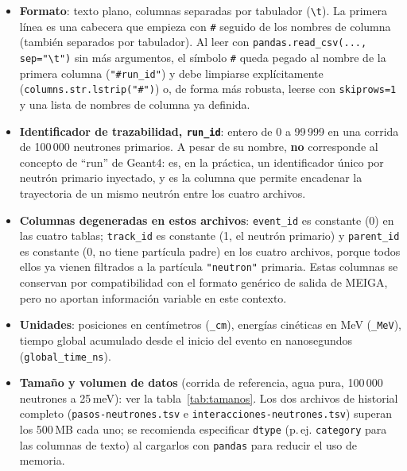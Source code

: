 \documentclass[11pt,a4paper]{article}
\newcommand{\codigo}[1]{\nolinkurl{#1}}
\newcommand{\archivo}[1]{\texttt{#1}} %
\newcommand{\var}[1]{\texttt{#1}}
\begin{document}
\begin{itemize}
  \item \textbf{Formato}: texto plano, columnas separadas por tabulador (\texttt{\textbackslash t}).
  La primera línea es una cabecera que empieza con \texttt{\#} seguido de los nombres de columna
  (también separados por tabulador). Al leer con \texttt{pandas.read\_csv(..., sep="\textbackslash t")}
  sin más argumentos, el símbolo \texttt{\#} queda pegado al nombre de la primera columna
  (\texttt{"\#run\_id"}) y debe limpiarse explícitamente (\codigo{columns.str.lstrip("\#")}) o, de
  forma más robusta, leerse con \codigo{skiprows=1} y una lista de nombres de columna ya definida.
  \item \textbf{Identificador de trazabilidad, \var{run\_id}}: entero de 0 a 99\,999 en una corrida
  de 100\,000 neutrones primarios. A pesar de su nombre, \textbf{no} corresponde al concepto de
  ``run'' de Geant4: es, en la práctica, un identificador único por neutrón primario inyectado, y es
  la columna que permite encadenar la trayectoria de un mismo neutrón entre los cuatro archivos.
  \item \textbf{Columnas degeneradas en estos archivos}: \var{event\_id} es constante (0) en las
  cuatro tablas; \var{track\_id} es constante (1, el neutrón primario) y \var{parent\_id} es
  constante (0, no tiene partícula padre) en los cuatro archivos, porque todos ellos ya vienen
  filtrados a la partícula \var{"neutron"} primaria. Estas columnas se conservan por compatibilidad
  con el formato genérico de salida de MEIGA, pero no aportan información variable en este contexto.
  \item \textbf{Unidades}: posiciones en centímetros (\var{\_cm}), energías cinéticas en MeV
  (\var{\_MeV}), tiempo global acumulado desde el inicio del evento en nanosegundos
  (\var{global\_time\_ns}).
  \item \textbf{Tamaño y volumen de datos} (corrida de referencia, agua pura, 100\,000 neutrones a
  25\,meV): ver la tabla~\ref{tab:tamanos}. Los dos archivos de historial completo
  (\archivo{pasos-neutrones.tsv} e \archivo{interacciones-neutrones.tsv}) superan los 500\,MB cada
  uno; se recomienda especificar \codigo{dtype} (p.\,ej. \codigo{category} para las columnas de
  texto) al cargarlos con \codigo{pandas} para reducir el uso de memoria.
\end{itemize}
\end{document}
